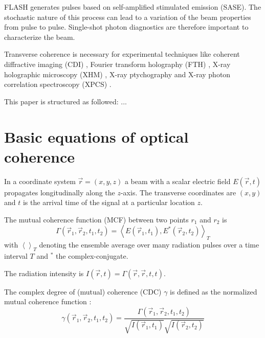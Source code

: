 \documentclass{osa-article}
\begin{document}
FLASH generates pulses based on self-amplified stimulated emission (SASE). The stochastic nature of this process can lead to a variation of the beam properties from pulse to pulse. Single-shot photon diagnostics are therefore important to characterize the beam.

Transverse coherence is necessary for experimental techniques like coherent diffractive imaging (CDI) \cite{Chapman2006,WilliamsQuineyPeeleEtAl2007,Abbey2008,Gutt2009,Seibert2011,Zuerch2017, Huang2018, Giewekemeyer2019}, Fourier transform holography (FTH) \cite{Eisebitt2004,Streit-Nierobisch2009,Schaffert2013}, X-ray holographic microscopy (XHM) \cite{Stickler2010,Lider2015}, X-ray ptychography \cite{Rodenburg2007,Bunk2008,RoseSkopintsevDzhigaevEtAl2015,Pfeiffer2017} and X-ray photon correlation spectroscopy (XPCS) \cite{Gruebel2007,Gutt2008, Hruszkewycz2012, Roseker2018, Zhang2018}.

This paper is structured as followed: ...



\section{Basic equations of optical coherence}

In a coordinate system $\vec{r} = (x,y,z) $ a beam with a scalar electric field $ E(\vec{r}, t) $ propagates longitudinally along the $ z $-axis. The transverse coordinates are $ (x,y) $ and $ t $ is the arrival time of the signal at a particular location $ z $.

The mutual coherence function (MCF) \cite{Huang:2013nka} between two points $ r_1 $ and $ r_2 $ is
	\begin{equation}\label{eq:mcf_1}
	\Gamma(\vec{r}_1,\vec{r}_2,t_1,t_2) = \left\langle E(\vec{r}_1, t_1), E^*(\vec{r}_2, t_2) \right\rangle_T
	\end{equation} 
with $ \left\langle \right\rangle_T $ denoting the ensemble average over many radiation pulses over a time interval $ T $ and $ ^* $ the complex-conjugate.

The radiation intensity is $ I(\vec{r},t) = \Gamma(\vec{r},\vec{r},t,t) $.

The complex degree of (mutual) coherence (CDC) $ \gamma $ is defined as the normalized mutual coherence function \cite[eq.4]{BagschikFroemterMuellerEtAl2016a}:
	\begin{equation}\label{eq:cdc}
	\gamma(\vec{r}_1,\vec{r}_2,t_1,t_2) = \frac{\Gamma(\vec{r}_1,\vec{r}_2,t_1,t_2)}{\sqrt{ I(\vec{r}_1,t_1) } \sqrt{I(\vec{r}_2,t_2)}} 
	\end{equation}
\end{document}
